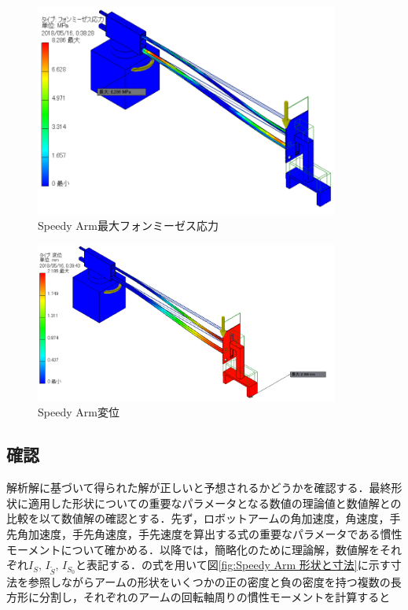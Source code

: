 \documentclass[10pt,b5paper,papersize,dvipdfmx]{jsbook}
\begin{document}
\begin{figure}[htbp]
  \centering
  \includegraphics[width=10cm]{img/robot29.png}
  \caption{Speedy Arm最大フォンミーゼス応力}
  \label{fig:Speedy Arm最大フォンミーゼス応力}
\end{figure}
\begin{figure}[htbp]
  \centering
  \includegraphics[width=10cm]{img/robot30.png}
  \caption{Speedy Arm変位}
  \label{fig:Speedy Arm変位}
\end{figure}
\subsection{確認}
解析解に基づいて得られた解が正しいと予想されるかどうかを確認する．最終形状に適用した形状についての重要なパラメータとなる数値の理論値と数値解との比較を以て数値解の確認とする．先ず，ロボットアームの角加速度，角速度，手先角加速度，手先角速度，手先速度を算出する式の重要なパラメータである慣性モーメントについて確かめる．以降では，簡略化のために理論解，数値解をそれぞれ$I_S,\,I_{\tilde{S}},\,I_{S_0}$と表記する．の式を用いて図\ref{fig:Speedy Arm 形状と寸法}に示す寸法を参照しながらアームの形状をいくつかの正の密度と負の密度を持つ複数の長方形に分割し，それぞれのアームの回転軸周りの慣性モーメントを計算すると
\end{document}
